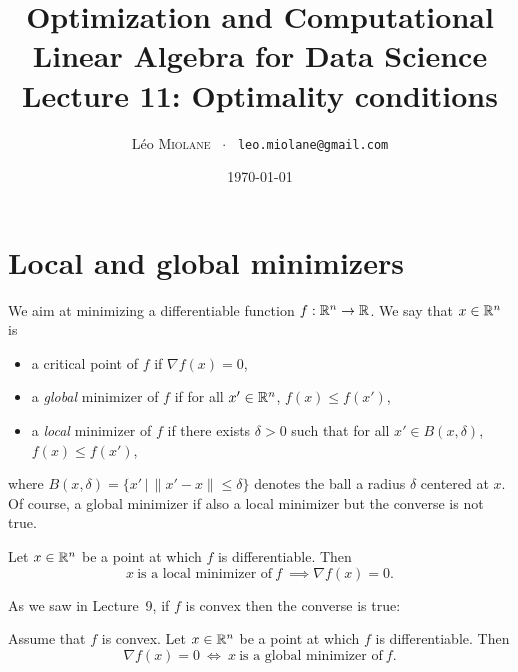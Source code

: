 \documentclass[11pt,nocut]{article}
\title{\vspace{-2.0cm}%
	Optimization and Computational Linear Algebra for Data Science\\
Lecture 11: Optimality conditions}
\author{Léo \textsc{Miolane} \ $\cdot$ \ \texttt{leo.miolane@gmail.com}}
\date{\today}
\begin{document}
\maketitle


\section{Local and global minimizers}\label{sec:min}

We aim at minimizing a differentiable function $f: \mathbb{R}^n \to \mathbb{R}$.
We say that $x \in \mathbb{R}^n$ is
\begin{itemize}
	\item a critical point of $f$ if $\nabla f(x) = 0$,
	\item a \emph{global} minimizer of $f$ if for all $x' \in \mathbb{R}^n$, $f(x) \leq f(x')$,
	\item a \emph{local} minimizer of $f$ if there exists $\delta > 0$ such that for all $x' \in B(x,\delta)$, $f(x) \leq f(x')$,
\end{itemize}
where $B(x,\delta) = \{x' \, | \, \|x'-x\| \leq \delta \}$ denotes the ball a radius $\delta$ centered at $x$.
Of course, a global minimizer if also a local minimizer but the converse is not true.

\begin{proposition}\label{prop:zero_grad}
	Let $x \in \mathbb{R}^n$ be a point at which $f$ is differentiable. 
	Then
	$$
	x \ \text{is a local minimizer of} \ f \ \implies \nabla f(x) = 0.
	$$
\end{proposition}

As we saw in Lecture~9, if $f$ is convex then the converse is true:

\begin{proposition}\label{prop:zero_grad_convex}
	Assume that $f$ is convex.
	Let $x \in \mathbb{R}^n$ be a point at which $f$ is differentiable. 
	Then
	$$
	\nabla f(x) = 0 \ \Longleftrightarrow \ x \ \text{is a global minimizer of} \ f.
	$$
\end{proposition}
\end{document}
